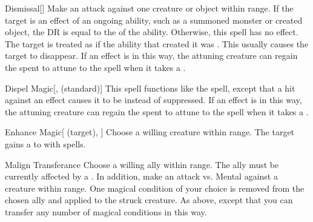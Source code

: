 \lowercase{\hypertarget{spell:Dismissal}{}}\label{spell:Dismissal}
\begin{freeability}[\nth{2}]{\hypertarget{spell:Dismissal}{Dismissal}}[]
Make an attack against one creature or object within \rngmed range.
If the target is an effect of an ongoing  ability, such as a summoned monster or created object, the DR is equal to the  of the ability.
Otherwise, this spell has no effect.
\hit The target is treated as if the ability that created it was .
This usually causes the target to disappear.
If an  effect is  in this way,
the attuning creature can regain the  spent to attune to the spell when it takes a .
\end{freeability}
\vspace{0.25em}



\lowercase{\hypertarget{spell:Dispel Magic}{}}\label{spell:Dispel Magic}
\begin{freeability}[\nth{2}]{\hypertarget{spell:Dispel Magic}{Dispel Magic}}[,  (standard)]
This spell functions like the  spell, except that a hit against an effect causes it to be  instead of suppressed.
If an  effect is  in this way,
the attuning creature can regain the  spent to attune to the spell when it takes a .
\end{freeability}
\vspace{0.25em}



\lowercase{\hypertarget{spell:Enhance Magic}{}}\label{spell:Enhance Magic}
\begin{attuneability}[\nth{2}]{\hypertarget{spell:Enhance Magic}{Enhance Magic}}[ (target), ]
Choose a willing creature within \rngmed range.
The target gains a   to  with spells.
\end{attuneability}
\vspace{0.25em}



\lowercase{\hypertarget{spell:Malign Transferance}{}}\label{spell:Malign Transferance}
\begin{freeability}[\nth{2}]{\hypertarget{spell:Malign Transferance}{Malign Transferance}}
Choose a willing ally within \rngmed range.
The ally must be currently affected by a  .
In addition, make an attack vs. Mental against a creature within \rngmed range.
\hit One magical condition of your choice is removed from the chosen ally and applied to the struck creature.
\crit As above, except that you can transfer any number of magical conditions in this way.
\end{freeability}
\vspace{0.25em}



